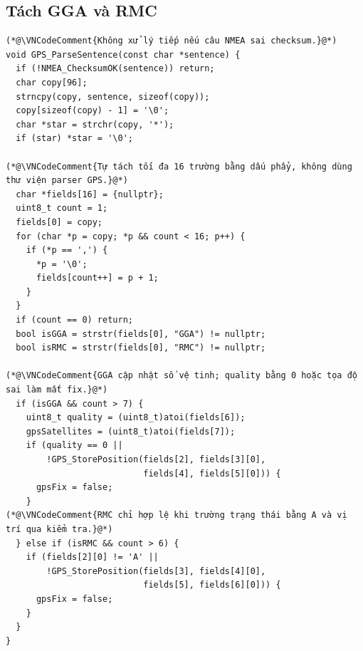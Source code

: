 \documentclass[12pt]{article}
\begin{document}
\subsection{Tách GGA và RMC}
\begin{lstlisting}[style=firmware,caption={Parser câu GGA/RMC sau khi checksum hợp lệ}]
(*@\VNCodeComment{Không xử lý tiếp nếu câu NMEA sai checksum.}@*)
void GPS_ParseSentence(const char *sentence) {
  if (!NMEA_ChecksumOK(sentence)) return;
  char copy[96];
  strncpy(copy, sentence, sizeof(copy));
  copy[sizeof(copy) - 1] = '\0';
  char *star = strchr(copy, '*');
  if (star) *star = '\0';

(*@\VNCodeComment{Tự tách tối đa 16 trường bằng dấu phẩy, không dùng thư viện parser GPS.}@*)
  char *fields[16] = {nullptr};
  uint8_t count = 1;
  fields[0] = copy;
  for (char *p = copy; *p && count < 16; p++) {
    if (*p == ',') {
      *p = '\0';
      fields[count++] = p + 1;
    }
  }
  if (count == 0) return;
  bool isGGA = strstr(fields[0], "GGA") != nullptr;
  bool isRMC = strstr(fields[0], "RMC") != nullptr;

(*@\VNCodeComment{GGA cập nhật số vệ tinh; quality bằng 0 hoặc tọa độ sai làm mất fix.}@*)
  if (isGGA && count > 7) {
    uint8_t quality = (uint8_t)atoi(fields[6]);
    gpsSatellites = (uint8_t)atoi(fields[7]);
    if (quality == 0 ||
        !GPS_StorePosition(fields[2], fields[3][0],
                           fields[4], fields[5][0])) {
      gpsFix = false;
    }
(*@\VNCodeComment{RMC chỉ hợp lệ khi trường trạng thái bằng A và vị trí qua kiểm tra.}@*)
  } else if (isRMC && count > 6) {
    if (fields[2][0] != 'A' ||
        !GPS_StorePosition(fields[3], fields[4][0],
                           fields[5], fields[6][0])) {
      gpsFix = false;
    }
  }
}
\end{lstlisting}
\end{document}
